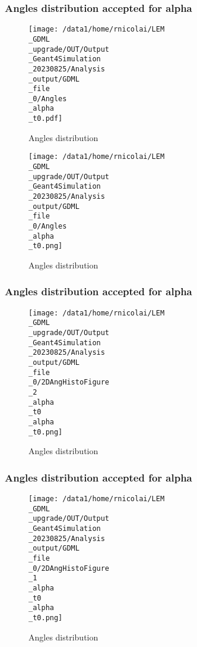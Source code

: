 \documentclass[8pt]{beamer}
\begin{document}
            \begin{frame}
                \frametitle{Angles distribution accepted for alpha}
            
        \begin{figure}[h]
            \centering
            \texttt{[image: /data1/home/rnicolai/LEM\\\_GDML\\\_upgrade/OUT/Output\\\_Geant4Simulation\\\_20230825/Analysis\\\_output/GDML\\\_file\\\_0/Angles\\\_alpha\\\_t0.pdf]}
            \caption{Angles distribution}
        \end{figure}
        
        \begin{figure}[h]
            \centering
            \texttt{[image: /data1/home/rnicolai/LEM\\\_GDML\\\_upgrade/OUT/Output\\\_Geant4Simulation\\\_20230825/Analysis\\\_output/GDML\\\_file\\\_0/Angles\\\_alpha\\\_t0.png]}
            \caption{Angles distribution}
        \end{figure}
        
            \end{frame}
            
            \begin{frame}
                \frametitle{Angles distribution accepted for alpha}
            
        \begin{figure}[h]
            \centering
            \texttt{[image: /data1/home/rnicolai/LEM\\\_GDML\\\_upgrade/OUT/Output\\\_Geant4Simulation\\\_20230825/Analysis\\\_output/GDML\\\_file\\\_0/2DAngHistoFigure\\\_2\\\_alpha\\\_t0\\\_alpha\\\_t0.png]}
            \caption{Angles distribution}
        \end{figure}
        
            \end{frame}
            
            \begin{frame}
                \frametitle{Angles distribution accepted for alpha}
            
        \begin{figure}[h]
            \centering
            \texttt{[image: /data1/home/rnicolai/LEM\\\_GDML\\\_upgrade/OUT/Output\\\_Geant4Simulation\\\_20230825/Analysis\\\_output/GDML\\\_file\\\_0/2DAngHistoFigure\\\_1\\\_alpha\\\_t0\\\_alpha\\\_t0.png]}
            \caption{Angles distribution}
        \end{figure}
        
            \end{frame}
            
\end{document}
